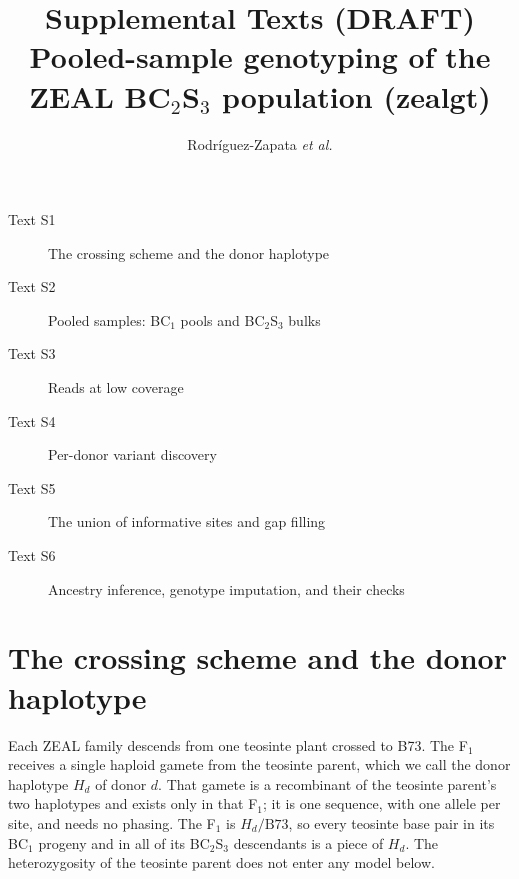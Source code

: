 \documentclass[11pt]{article}
\title{Supplemental Texts (DRAFT)\\[2pt]
\large Pooled-sample genotyping of the ZEAL BC$_2$S$_3$ population (zealgt)}
\author{Rodr\'iguez-Zapata \textit{et al.}}
\date{}
\newcommand{\Hd}{H_d}
\begin{document}
\maketitle

\begin{description}
\item[Text S1] The crossing scheme and the donor haplotype
\item[Text S2] Pooled samples: BC$_1$ pools and BC$_2$S$_3$ bulks
\item[Text S3] Reads at low coverage
\item[Text S4] Per-donor variant discovery
\item[Text S5] The union of informative sites and gap filling
\item[Text S6] Ancestry inference, genotype imputation, and their checks
\end{description}
\clearpage

\section{The crossing scheme and the donor haplotype}
\label{sec:scheme}

Each ZEAL family descends from one teosinte plant crossed to B73. The F$_1$ receives a single haploid gamete from the teosinte parent,
which we call the donor haplotype $\Hd$ of donor $d$. That gamete is a recombinant of the teosinte parent's two haplotypes and exists only
in that F$_1$; it is one sequence, with one allele per site, and needs no phasing. The F$_1$ is $\Hd/\mathrm{B73}$, so every teosinte base
pair in its BC$_1$ progeny and in all of its BC$_2$S$_3$ descendants is a piece of $\Hd$. The heterozygosity of the teosinte parent does
not enter any model below.
\end{document}
